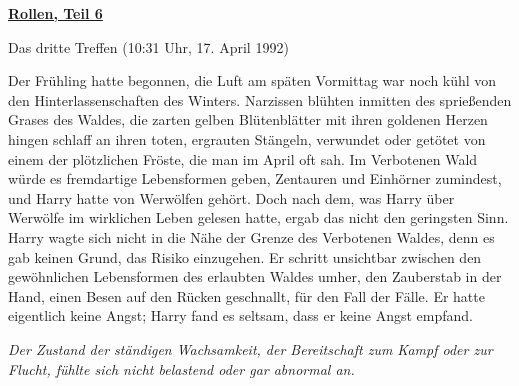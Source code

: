 

\hypertarget{rollen-teil-6}{%

\textbf{\uline{Rollen, Teil 6}}

Das dritte Treffen (10:31 Uhr, 17. April 1992)

Der Frühling hatte begonnen, die Luft am späten Vormittag war noch kühl von den Hinterlassenschaften des Winters. Narzissen blühten inmitten des sprießenden Grases des Waldes, die zarten gelben Blütenblätter mit ihren goldenen Herzen hingen schlaff an ihren toten, ergrauten Stängeln, verwundet oder getötet von einem der plötzlichen Fröste, die man im April oft sah. Im Verbotenen Wald würde es fremdartige Lebensformen geben, Zentauren und Einhörner zumindest, und Harry hatte von Werwölfen gehört. Doch nach dem, was Harry über Werwölfe im wirklichen Leben gelesen hatte, ergab das nicht den geringsten Sinn. Harry wagte sich nicht in die Nähe der Grenze des Verbotenen Waldes, denn es gab keinen Grund, das Risiko einzugehen. Er schritt unsichtbar zwischen den gewöhnlichen Lebensformen des erlaubten Waldes umher, den Zauberstab in der Hand, einen Besen auf den Rücken geschnallt, für den Fall der Fälle. Er hatte eigentlich keine Angst; Harry fand es seltsam, dass er keine Angst empfand.

\emph{Der Zustand der ständigen Wachsamkeit, der Bereitschaft zum Kampf oder zur Flucht, fühlte sich nicht belastend oder gar abnormal an.}

}
